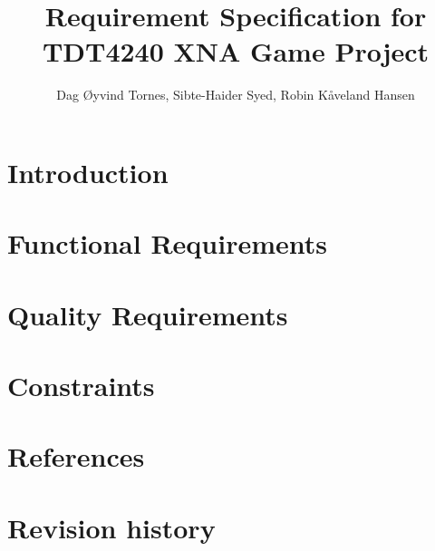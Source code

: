 \documentclass[a4paper,11pt]{article}
\author{Dag Øyvind Tornes, Sibte-Haider Syed, Robin Kåveland Hansen}
\title{Requirement Specification for TDT4240 XNA Game Project}
\begin{document}
\maketitle

\clearpage


\tableofcontents

\section{Introduction}

\section{Functional Requirements}

\section{Quality Requirements}

\section{Constraints}

\section{References}


\section{Revision history}
\end{document}
